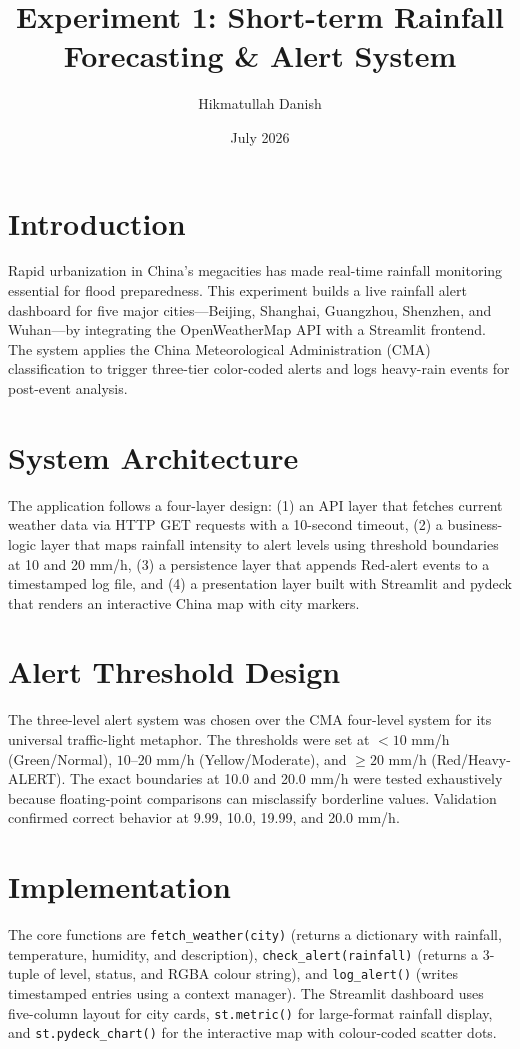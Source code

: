 \documentclass[12pt,a4paper]{article}
\title{Experiment 1: Short-term Rainfall Forecasting \& Alert System}
\author{Hikmatullah Danish \quad 3125999089}
\date{July 2026}
\begin{document}
\maketitle

\section{Introduction}
Rapid urbanization in China's megacities has made real-time rainfall monitoring essential for flood preparedness. This experiment builds a live rainfall alert dashboard for five major cities—Beijing, Shanghai, Guangzhou, Shenzhen, and Wuhan—by integrating the OpenWeatherMap API with a Streamlit frontend. The system applies the China Meteorological Administration (CMA) classification to trigger three-tier color-coded alerts and logs heavy-rain events for post-event analysis.

\section{System Architecture}
The application follows a four-layer design: (1) an API layer that fetches current weather data via HTTP GET requests with a 10-second timeout, (2) a business-logic layer that maps rainfall intensity to alert levels using threshold boundaries at 10 and 20 mm/h, (3) a persistence layer that appends Red-alert events to a timestamped log file, and (4) a presentation layer built with Streamlit and pydeck that renders an interactive China map with city markers.

\section{Alert Threshold Design}
The three-level alert system was chosen over the CMA four-level system for its universal traffic-light metaphor. The thresholds were set at $<10$ mm/h (Green/Normal), $10$--$20$ mm/h (Yellow/Moderate), and $\geq 20$ mm/h (Red/Heavy-ALERT). The exact boundaries at 10.0 and 20.0 mm/h were tested exhaustively because floating-point comparisons can misclassify borderline values. Validation confirmed correct behavior at 9.99, 10.0, 19.99, and 20.0 mm/h.

\section{Implementation}
The core functions are \texttt{fetch\_weather(city)} (returns a dictionary with rainfall, temperature, humidity, and description), \texttt{check\_alert(rainfall)} (returns a 3-tuple of level, status, and RGBA colour string), and \texttt{log\_alert()} (writes timestamped entries using a context manager). The Streamlit dashboard uses five-column layout for city cards, \texttt{st.metric()} for large-format rainfall display, and \texttt{st.pydeck\_chart()} for the interactive map with colour-coded scatter dots.
\end{document}
